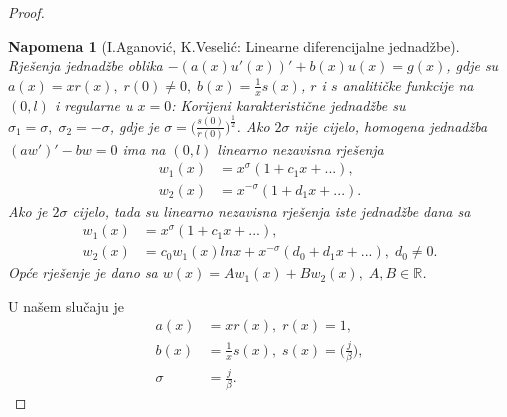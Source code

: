 \documentclass[a4paper,oneside,12pt]{memoir} %
\newtheorem{nap}[teorem]{Napomena}
\begin{document}
\begin{proof}
\begin{nap}[I.Aganović, K.Veselić: Linearne diferencijalne jednadžbe]
Rješenja jednadžbe oblika $-(a(x) u'(x))' + b(x) u(x) = g(x)$, gdje su $a(x) = x r(x), \; r(0) \neq 0, \; b(x) = \frac{1}{x} s(x)$, $r$ i $s$ analitičke funkcije na $(0, l)$ i regularne u $x = 0$: \newline
Korijeni karakteristične jednadžbe su $\sigma_1 = \sigma, \; \sigma_2 = - \sigma$, gdje je $\sigma = \Big( \frac{s(0)}{r(0)} \Big)^{\frac{1}{2}}$. \newline
Ako $2 \sigma$ nije cijelo, homogena jednadžba $(aw')' - bw = 0$ ima na $(0,l)$ linearno nezavisna rješenja
\begin{align*}
w_1(x) &= x^\sigma (1 + c_1 x + ...), \\
w_2(x) &= x^{-\sigma} (1 + d_1 x + ...).
\end{align*}
Ako je $2 \sigma$ cijelo, tada su linearno nezavisna rješenja iste jednadžbe dana sa
\begin{align*}
w_1(x) &= x^\sigma (1 + c_1 x + ...), \\
w_2(x) &= c_0 w_1(x) lnx + x^{-\sigma} (d_0 + d_1 x + ...), \; d_0 \neq 0.
\end{align*}
Opće rješenje je dano sa $w(x) = A w_1(x) + B w_2(x), \; A, B \in \mathbb{R}$.
\end{nap}

U našem slučaju je
\begin{align*}
a(x) &= x r(x), \; r(x) = 1, \\
b(x) &= \frac{1}{x} s(x), \; s(x) = \Big( \frac{j}{\beta} \Big), \\
\sigma &= \frac{j}{\beta}.
\end{align*}


\end{proof}
\end{document}
